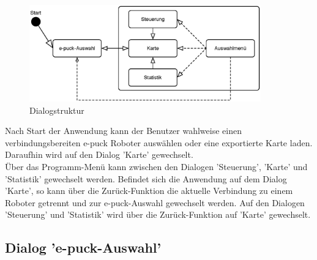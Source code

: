 \documentclass[10pt,a4paper]{article}
\begin{document}
			\begin{figure}[h]
				\centering
				\includegraphics[width=10cm]{dialog.eps}
  				\caption{Dialogstruktur}
  			\end{figure}
  			
  			Nach Start der Anwendung kann der Benutzer wahlweise einen verbindungsbereiten e-puck Roboter auswählen oder eine
  			exportierte Karte laden. Daraufhin wird auf den Dialog 'Karte' gewechselt. \\
  			Über das Programm-Menü kann zwischen den Dialogen 'Steuerung', 'Karte' und 'Statistik' gewechselt werden. Befindet sich die
  			Anwendung auf dem Dialog 'Karte', so kann über die Zurück-Funktion die aktuelle Verbindung zu einem Roboter getrennt
  			und zur  e-puck-Auswahl gewechselt werden. Auf den Dialogen 'Steuerung' und 'Statistik' wird über die Zurück-Funktion
  			auf 'Karte' gewechselt.
  			
  			\subsection{Dialog 'e-puck-Auswahl'}
  			
\end{document}
